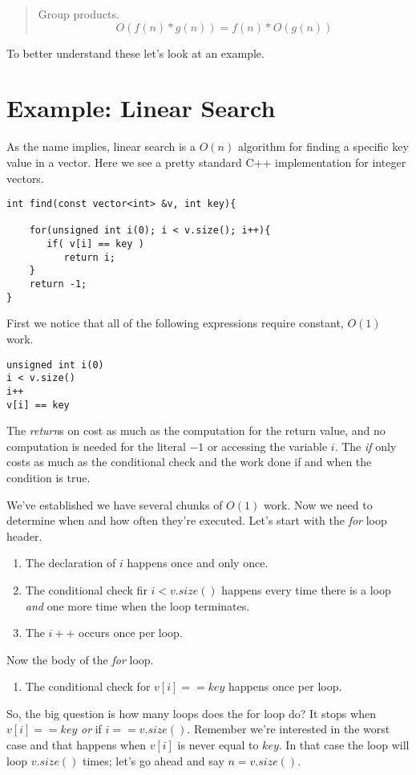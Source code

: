 \documentclass[]{tufte-handout}
\begin{document}
\begin{quote}
Group products.
\[
O(f(n)*g(n)) = f(n)*O(g(n)) 
\]
\end{quote}

To better understand these let's look at an example.

\section{Example: Linear Search}

As the name implies, linear search is a $O(n)$ algorithm for finding a specific key value in a vector. Here we see a pretty standard C++ implementation for integer vectors.

\begin{verbatim}
int find(const vector<int> &v, int key){
	
	for(unsigned int i(0); i < v.size(); i++){
       if( v[i] == key )
          return i;  	
	}
	return -1;
}
\end{verbatim}

First we notice that all of the following expressions require constant, $O(1)$ work.
\begin{verbatim}
unsigned int i(0)
i < v.size()
i++
v[i] == key
\end{verbatim}
The \textit{return}s on cost as much as the computation for the return value, and no computation is needed for the literal $-1$ or accessing the variable $i$. The \textit{if} only costs as much as the conditional check and the work done if and when the condition is true. 

We've established we have several chunks of $O(1)$ work. Now we need to determine when and how often they're executed.  Let's start with the \textit{for} loop header.  
\begin{enumerate}
\item The declaration of $i$ happens once and only once.  
\item The conditional check fir $i < v.size()$ happens every time there is a loop \textit{and} one more time when the loop terminates.  
\item The $i++$ occurs once per loop. 
\end{enumerate}
Now the body of the \textit{for} loop.
\begin{enumerate}
\item The conditional check for $v[i] == key$ happens once per loop.
\end{enumerate}

So, the big question is how many loops does the for loop do?  It stops when $v[i]==key$ \textit{or} if $i == v.size()$. Remember we're interested in the worst case and that happens when $v[i]$ is never equal to $key$. In that case the loop will loop $v.size()$ times;  let's go ahead and say $n = v.size()$.
\end{document}
